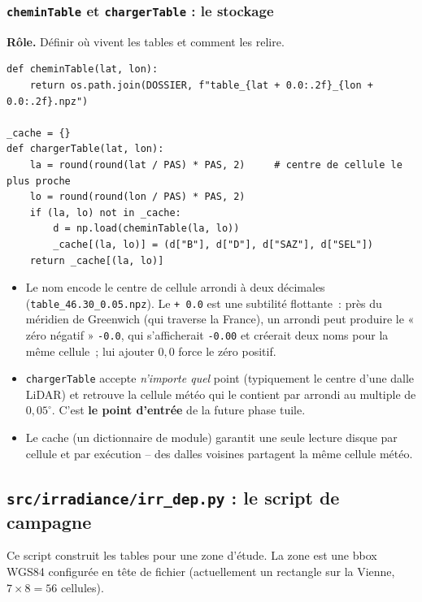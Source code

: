 \documentclass[11pt,a4paper]{article}
\newcommand{\fichier}[1]{\texttt{#1}}
\newcommand{\fonction}[1]{\texttt{#1}}
\begin{document}
\subsubsection{\fonction{cheminTable} et \fonction{chargerTable} : le stockage}

\textbf{Rôle.} Définir où vivent les tables et comment les relire.

\begin{lstlisting}
def cheminTable(lat, lon):
    return os.path.join(DOSSIER, f"table_{lat + 0.0:.2f}_{lon + 0.0:.2f}.npz")

_cache = {}
def chargerTable(lat, lon):
    la = round(round(lat / PAS) * PAS, 2)     # centre de cellule le plus proche
    lo = round(round(lon / PAS) * PAS, 2)
    if (la, lo) not in _cache:
        d = np.load(cheminTable(la, lo))
        _cache[(la, lo)] = (d["B"], d["D"], d["SAZ"], d["SEL"])
    return _cache[(la, lo)]
\end{lstlisting}

\begin{itemize}
  \item Le nom encode le centre de cellule arrondi à deux décimales
    (\fichier{table\_46.30\_0.05.npz}). Le \fonction{+ 0.0} est une subtilité
    flottante~: près du méridien de Greenwich (qui traverse la France), un
    arrondi peut produire le « zéro négatif » \fonction{-0.0}, qui s'afficherait
    \fichier{-0.00} et créerait deux noms pour la même cellule~; lui ajouter
    $0{,}0$ force le zéro positif.
  \item \fonction{chargerTable} accepte \emph{n'importe quel} point (typiquement
    le centre d'une dalle LiDAR) et retrouve la cellule météo qui le contient
    par arrondi au multiple de $0{,}05^\circ$. C'est \textbf{le point d'entrée}
    de la future phase tuile.
  \item Le cache (un dictionnaire de module) garantit une seule lecture disque
    par cellule et par exécution -- des dalles voisines partagent la même
    cellule météo.
\end{itemize}

\subsection{\fichier{src/irradiance/irr\_dep.py} : le script de campagne}

Ce script construit les tables pour une zone d'étude. La zone est une bbox
WGS84 configurée en tête de fichier (actuellement un rectangle sur la Vienne,
$7 \times 8 = 56$ cellules).
\end{document}
